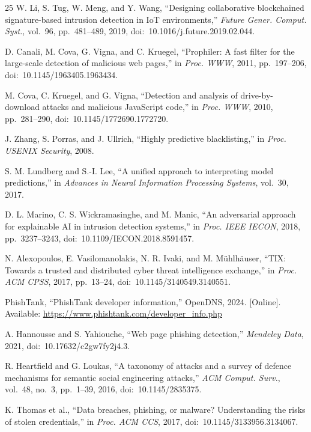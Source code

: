 \documentclass[conference]{IEEEtran}
\begin{document}
\begin{thebibliography}{25}
W. Li, S. Tug, W. Meng, and Y. Wang, ``Designing collaborative blockchained signature-based
intrusion detection in IoT environments,'' \emph{Future Gener. Comput. Syst.}, vol.~96,
pp.~481--489, 2019, doi:~10.1016/j.future.2019.02.044.

D. Canali, M. Cova, G. Vigna, and C. Kruegel, ``Prophiler: A fast filter for the large-scale
detection of malicious web pages,'' in \emph{Proc. WWW}, 2011, pp.~197--206,
doi:~10.1145/1963405.1963434.

M. Cova, C. Kruegel, and G. Vigna, ``Detection and analysis of drive-by-download attacks and
malicious JavaScript code,'' in \emph{Proc. WWW}, 2010, pp.~281--290,
doi:~10.1145/1772690.1772720.

J. Zhang, S. Porras, and J. Ullrich, ``Highly predictive blacklisting,'' in
\emph{Proc. USENIX Security}, 2008.

S. M. Lundberg and S.-I. Lee, ``A unified approach to interpreting model predictions,'' in
\emph{Advances in Neural Information Processing Systems}, vol.~30, 2017.

D. L. Marino, C. S. Wickramasinghe, and M. Manic, ``An adversarial approach for explainable AI
in intrusion detection systems,'' in \emph{Proc. IEEE IECON}, 2018, pp.~3237--3243,
doi:~10.1109/IECON.2018.8591457.

N. Alexopoulos, E. Vasilomanolakis, N. R. Ivaki, and M. M\"{u}hlh\"{a}user, ``TIX: Towards a
trusted and distributed cyber threat intelligence exchange,'' in \emph{Proc. ACM CPSS}, 2017,
pp.~13--24, doi:~10.1145/3140549.3140551.

PhishTank, ``PhishTank developer information,'' OpenDNS, 2024. [Online].
Available: \url{https://www.phishtank.com/developer_info.php}

A. Hannousse and S. Yahiouche, ``Web page phishing detection,'' \emph{Mendeley Data}, 2021,
doi:~10.17632/c2gw7fy2j4.3.

R. Heartfield and G. Loukas, ``A taxonomy of attacks and a survey of defence mechanisms for
semantic social engineering attacks,'' \emph{ACM Comput. Surv.}, vol.~48, no.~3, pp.~1--39,
2016, doi:~10.1145/2835375.

K. Thomas et al., ``Data breaches, phishing, or malware? Understanding the risks of stolen
credentials,'' in \emph{Proc. ACM CCS}, 2017, doi:~10.1145/3133956.3134067.

\end{thebibliography}
\end{document}
